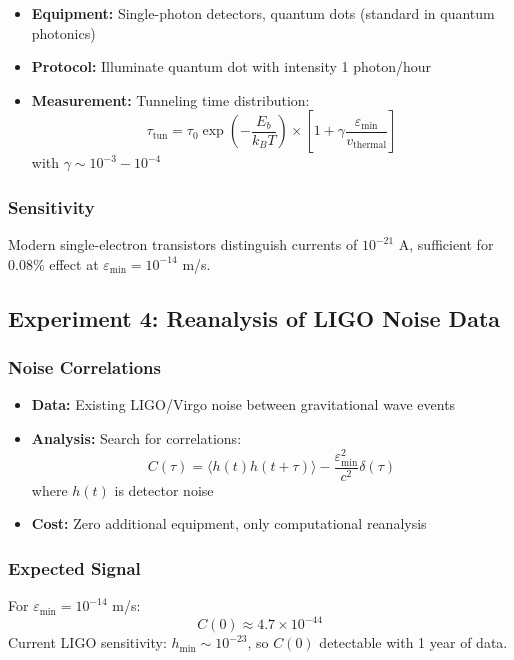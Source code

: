 \documentclass[11pt,a4paper]{article}
\begin{document}
	\begin{itemize}
		\item \textbf{Equipment:} Single-photon detectors, quantum dots (standard in quantum photonics)
		\item \textbf{Protocol:} Illuminate quantum dot with intensity 1 photon/hour
		\item \textbf{Measurement:} Tunneling time distribution:
		\[
		\tau_{\text{tun}} = \tau_0 \exp\left(-\frac{E_b}{k_B T}\right) \times \left[1 + \gamma\frac{\varepsilon_{\min}}{v_{\text{thermal}}}\right]
		\]
		with $\gamma \sim 10^{-3} - 10^{-4}$
	\end{itemize}
	
	\subsubsection{Sensitivity}
	
	Modern single-electron transistors distinguish currents of $10^{-21}$ A, sufficient for 0.08\% effect at $\varepsilon_{\min} = 10^{-14}$ m/s.
	
	\subsection{Experiment 4: Reanalysis of LIGO Noise Data}
	
	\subsubsection{Noise Correlations}
	
	\begin{itemize}
		\item \textbf{Data:} Existing LIGO/Virgo noise between gravitational wave events
		\item \textbf{Analysis:} Search for correlations:
		\[
		C(\tau) = \langle h(t)h(t+\tau)\rangle - \frac{\varepsilon_{\min}^2}{c^2}\delta(\tau)
		\]
		where $h(t)$ is detector noise
		\item \textbf{Cost:} Zero additional equipment, only computational reanalysis
	\end{itemize}
	
	\subsubsection{Expected Signal}
	
	For $\varepsilon_{\min} = 10^{-14}$ m/s:
	\[
	C(0) \approx 4.7 \times 10^{-44}
	\]
	Current LIGO sensitivity: $h_{\text{min}} \sim 10^{-23}$, so $C(0)$ detectable with 1 year of data.
	
\end{document}
